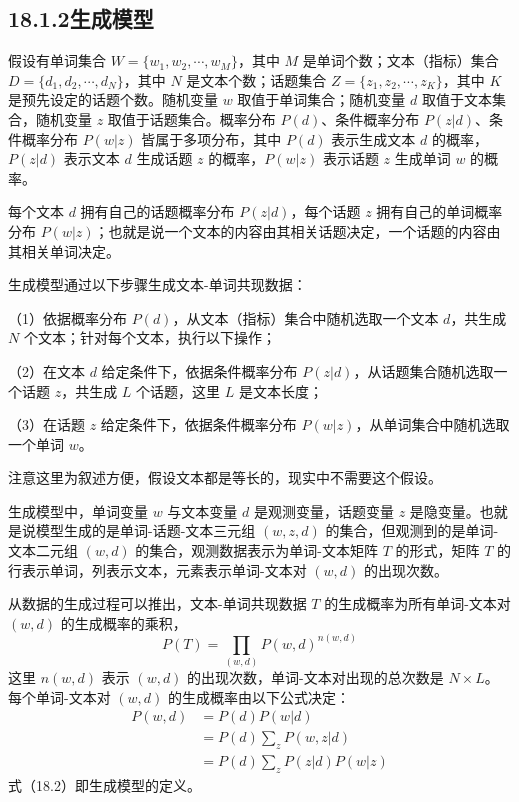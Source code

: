 \documentclass[UTF8,12pt,a4paper,fontset=fandol]{ctexart}
\begin{document}
\subsection*{18.1.2\quad 生成模型}

假设有单词集合 $W=\{w_1,w_2,\cdots,w_M\}$，其中 $M$ 是单词个数；文本（指标）集合 $D=\{d_1,d_2,\cdots,d_N\}$，其中 $N$ 是文本个数；话题集合 $Z=\{z_1,z_2,\cdots,z_K\}$，其中 $K$ 是预先设定的话题个数。随机变量 $w$ 取值于单词集合；随机变量 $d$ 取值于文本集合，随机变量 $z$ 取值于话题集合。概率分布 $P(d)$、条件概率分布 $P(z|d)$、条件概率分布 $P(w|z)$ 皆属于多项分布，其中 $P(d)$ 表示生成文本 $d$ 的概率，$P(z|d)$ 表示文本 $d$ 生成话题 $z$ 的概率，$P(w|z)$ 表示话题 $z$ 生成单词 $w$ 的概率。

每个文本 $d$ 拥有自己的话题概率分布 $P(z|d)$，每个话题 $z$ 拥有自己的单词概率分布 $P(w|z)$；也就是说一个文本的内容由其相关话题决定，一个话题的内容由其相关单词决定。

生成模型通过以下步骤生成文本-单词共现数据：

（1）依据概率分布 $P(d)$，从文本（指标）集合中随机选取一个文本 $d$，共生成 $N$ 个文本；针对每个文本，执行以下操作；

（2）在文本 $d$ 给定条件下，依据条件概率分布 $P(z|d)$，从话题集合随机选取一个话题 $z$，共生成 $L$ 个话题，这里 $L$ 是文本长度；

（3）在话题 $z$ 给定条件下，依据条件概率分布 $P(w|z)$，从单词集合中随机选取一个单词 $w$。

注意这里为叙述方便，假设文本都是等长的，现实中不需要这个假设。

生成模型中，单词变量 $w$ 与文本变量 $d$ 是观测变量，话题变量 $z$ 是隐变量。也就是说模型生成的是单词-话题-文本三元组 $(w,z,d)$ 的集合，但观测到的是单词-文本二元组 $(w,d)$ 的集合，观测数据表示为单词-文本矩阵 $T$ 的形式，矩阵 $T$ 的行表示单词，列表示文本，元素表示单词-文本对 $(w,d)$ 的出现次数。

从数据的生成过程可以推出，文本-单词共现数据 $T$ 的生成概率为所有单词-文本对 $(w,d)$ 的生成概率的乘积，
\begin{equation}
P(T)=\prod_{(w,d)}P(w,d)^{n(w,d)}
\tag{18.1}
\end{equation}
这里 $n(w,d)$ 表示 $(w,d)$ 的出现次数，单词-文本对出现的总次数是 $N\times L$。每个单词-文本对 $(w,d)$ 的生成概率由以下公式决定：
\begin{equation}
\begin{aligned}
P(w,d)&=P(d)P(w|d)\\
&=P(d)\sum_z P(w,z|d)\\
&=P(d)\sum_z P(z|d)P(w|z)
\end{aligned}
\tag{18.2}
\end{equation}
式（18.2）即生成模型的定义。
\end{document}

